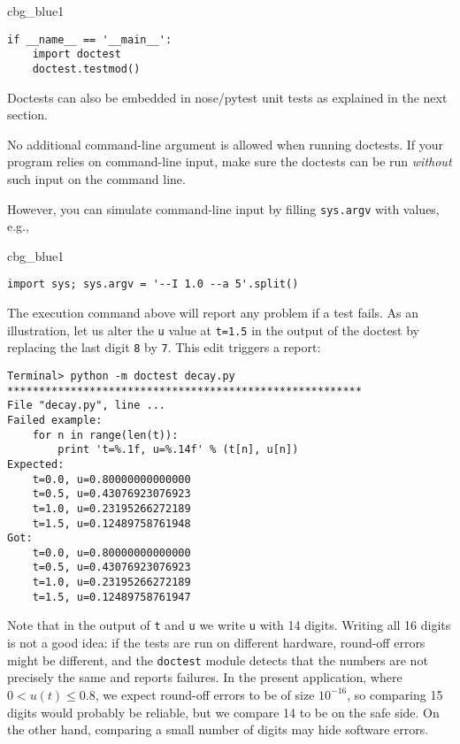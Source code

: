 \documentclass[graybox,sectrefs,envcountresetchap,open=right,final]{svmonodo}
\newenvironment{_cod_tight}[1]{
   \def\FrameCommand{\colorbox{#1}}
   \FrameRule0.6pt\MakeFramed {\FrameRestore}\vskip3mm}
   {\vskip0mm\endMakeFramed}
\newenvironment{cod}[1]{
\bgroup\rmfamily
\fboxsep=0mm\relax
\begin{_cod_tight}{#1}
\list{}{\parsep=-2mm\parskip=0mm\topsep=0pt\leftmargin=2mm
\rightmargin=2\leftmargin\leftmargin=4pt\relax}
\item\relax}
{\endlist\end{_cod_tight}\egroup}
\newenvironment{warning_mdfboxadmon}[1][]{
\begin{warning_mdfboxmdframed}[frametitle=#1]
}
{
\end{warning_mdfboxmdframed}
}
\begin{document}
\begin{cod}{cbg_blue1}\begin{Verbatim}[numbers=none,fontsize=\fontsize{9pt}{9pt},baselinestretch=0.95,xleftmargin=2mm]
if __name__ == '__main__':
    import doctest
    doctest.testmod()
\end{Verbatim}
\end{cod}
\noindent
Doctests can also be embedded in nose/pytest unit tests
as explained in the next section.


\begin{warning_mdfboxadmon}
No additional command-line argument is allowed when running doctests.
If your program relies on command-line input, make sure the doctests
can be run \emph{without} such input on the command line.

However, you can simulate command-line input by filling \texttt{sys.argv}
with values, e.g.,

\begin{cod}{cbg_blue1}\begin{Verbatim}[numbers=none,fontsize=\fontsize{9pt}{9pt},baselinestretch=0.95,xleftmargin=2mm]
import sys; sys.argv = '--I 1.0 --a 5'.split()
\end{Verbatim}
\end{cod}
\noindent
\end{warning_mdfboxadmon}



The execution command above will report any problem if a test fails.
As an illustration, let us alter the \texttt{u} value at \texttt{t=1.5} in
the output of the doctest by replacing the last digit \texttt{8} by \texttt{7}.
This edit triggers a report:

\begin{Verbatim}[frame=lines,label=\fbox{{\tiny Terminal}},framesep=2.5mm,framerule=0.7pt,fontsize=\fontsize{9pt}{9pt}]
Terminal> python -m doctest decay.py
********************************************************
File "decay.py", line ...
Failed example:
    for n in range(len(t)):
        print 't=%.1f, u=%.14f' % (t[n], u[n])
Expected:
    t=0.0, u=0.80000000000000
    t=0.5, u=0.43076923076923
    t=1.0, u=0.23195266272189
    t=1.5, u=0.12489758761948
Got:
    t=0.0, u=0.80000000000000
    t=0.5, u=0.43076923076923
    t=1.0, u=0.23195266272189
    t=1.5, u=0.12489758761947
\end{Verbatim}


\begin{warning_mdfboxadmon}
Note that in the output of \texttt{t} and \texttt{u} we write \texttt{u} with 14 digits.
Writing all 16 digits is not a good idea: if the tests are run on
different hardware, round-off errors might be different, and
the \texttt{doctest} module detects that the numbers are not precisely the same
and reports failures. In the present application, where $0 < u(t) \leq 0.8$,
we expect round-off errors to be of size $10^{-16}$, so comparing 15
digits would probably be reliable, but we compare 14 to be on the
safe side. On the other hand, comparing a small number of digits may
hide software errors.
\end{warning_mdfboxadmon}
\end{document}

